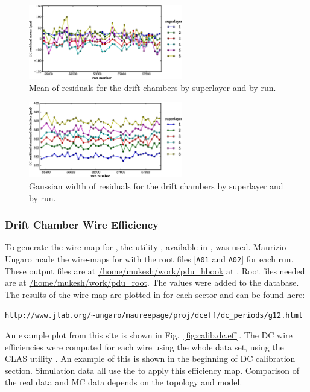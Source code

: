 \begin{figure}\begin{center}
\includegraphics[width=0.6\textwidth]{figures/calib/dc/dc_resid_mean.eps}
\caption[DC Residuals (Mean)]{\label{fig:calib.dc.residuals.mean}Mean of residuals for the drift chambers by superlayer and by run.}
\end{center}\end{figure}

\begin{figure}\begin{center}
\includegraphics[width=0.6\textwidth]{figures/calib/dc/dc_resid_sigma.eps}
\caption[DC Residuals (Width)]{\label{fig:calib.dc.residuals.wid}Gaussian width of residuals for the drift chambers by superlayer and by run.}
\end{center}\end{figure}

\subsubsection{\label{sec:calib.dc.eff}Drift Chamber Wire Efficiency}

To generate the wire map for , the utility , available in , was used. Maurizio Ungaro made the wire-maps for  with the root files [\verb+A01+ and \verb+A02+] for each run. These output files are at \url{/home/mukesh/work/pdu_hbook} at . Root files needed are at \url{/home/mukesh/work/pdu_root}. The values were added to the  database. The results of the wire map are plotted in for each sector and can be found here:
\begin{verbatim}
http://www.jlab.org/~ungaro/maureepage/proj/dceff/dc_periods/g12.html
\end{verbatim}
An example plot from this site is shown in Fig.~\ref{fig:calib.dc.eff}. The DC wire efficiencies were computed for each wire using the whole data set, using the CLAS utility . An example of this is shown in the beginning of DC calibration section. Simulation data all use the  to apply this efficiency map. Comparison of the real data and MC data depends on the topology and model.

